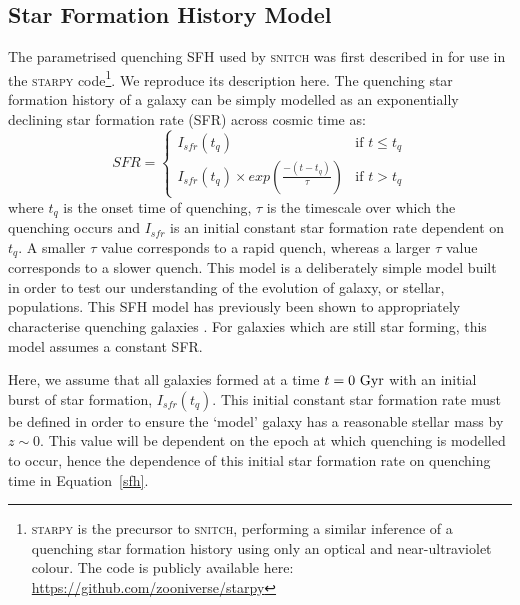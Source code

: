 \documentclass[useAMS,usenatbib]{mn2e}
\begin{document}
\subsection{Star Formation History Model}\label{sec:sfh}

The parametrised quenching SFH used by \textsc{snitch} was first described in \cite{smethurst15} for use in the \textsc{starpy} code\footnote{\textsc{starpy} is the precursor to \textsc{snitch}, performing a similar inference of a quenching star formation history using only an optical and near-ultraviolet colour. The code is publicly available here: \url{https://github.com/zooniverse/starpy}}. We reproduce its description here. The quenching star formation history of a galaxy can be simply modelled as an exponentially declining star formation rate (SFR) across cosmic time as:
\begin{equation}\label{sfh}
SFR =
\begin{cases}
I_{sfr}(t_q) & \text{if } t \leq t_q \\
I_{sfr}(t_q) \times exp{\left( \frac{-(t-t_{q})}{\tau}\right)} & \text{if } t > t_q 
\end{cases}
\end{equation}
where $t_{q}$ is the onset time of quenching, $\tau$ is the timescale over which the quenching occurs and $I_{sfr}$ is an initial constant star formation rate dependent on $t_q$.  A smaller $\tau$ value corresponds to a rapid quench, whereas a larger $\tau$ value corresponds to a slower quench. This model is a deliberately simple model built in order to test our understanding of the evolution of galaxy, or stellar, populations. This SFH model has previously been shown to appropriately characterise quenching galaxies \citep{weiner06, martin07, noeske07,schawinski14, smethurst15}. For galaxies which are still star forming, this model assumes a constant SFR.



Here, we assume that all galaxies formed at a time $t=0~\rm{Gyr}$ with an initial burst of star formation, $I_{sfr}(t_q)$. This initial constant star formation rate must be defined in order to ensure the `model' galaxy  has a reasonable stellar mass by $z\sim0$. This value will be dependent on the epoch at which quenching is modelled to occur, hence the dependence of this initial star formation rate on quenching time in Equation~\ref{sfh}. 
\end{document}
